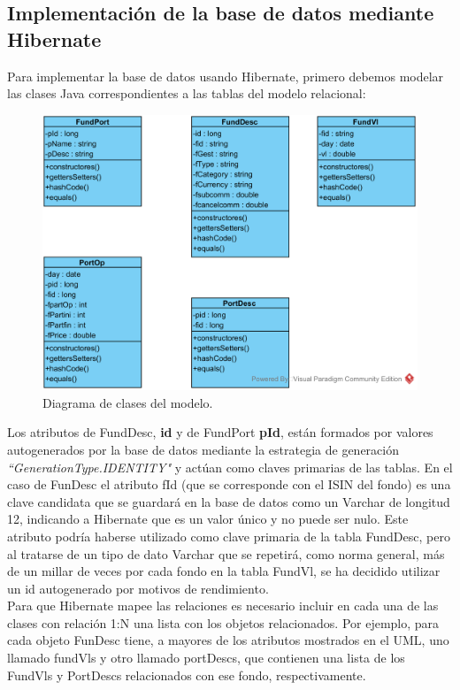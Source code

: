 \documentclass[12pt, a4paper]{book}
\begin{document}
\subsection{Implementación de la base de datos mediante Hibernate}

Para implementar la base de datos usando Hibernate, primero debemos modelar las clases Java correspondientes a las tablas del modelo relacional:\\

\begin{figure}[htbp]
	\centering
	\includegraphics[width=\textwidth]{figuras/Diagrama_clases.png}
	\caption{Diagrama de clases del modelo.}
	\label{fig:mclases}
	\end {figure}

Los atributos de FundDesc, \textbf{id} y de FundPort \textbf{pId}, están formados por valores autogenerados por la base de datos mediante la estrategia de generación \textit{``GenerationType.IDENTITY"} y actúan como claves primarias de las tablas. En el caso de FunDesc el atributo fId (que se corresponde con el \gls{ISIN} del fondo) es una clave candidata que se guardará en la base de datos como un Varchar de longitud 12, indicando a Hibernate que es un valor único y no puede ser nulo. Este atributo podría haberse utilizado como clave primaria de la tabla FundDesc, pero al tratarse de un tipo de dato Varchar que se repetirá, como norma general, más de un millar de veces por cada fondo en la tabla FundVl, se ha decidido utilizar un id autogenerado por motivos de rendimiento.\\

Para que Hibernate mapee las relaciones es necesario incluir en cada una de las clases con relación 1:N una lista con los objetos relacionados. Por ejemplo, para cada objeto FunDesc tiene, a mayores de los atributos mostrados en el \gls{UML}, uno llamado fundVls y otro llamado portDescs, que contienen una lista de los FundVls y PortDescs relacionados con ese fondo, respectivamente.\\
\end{document}
